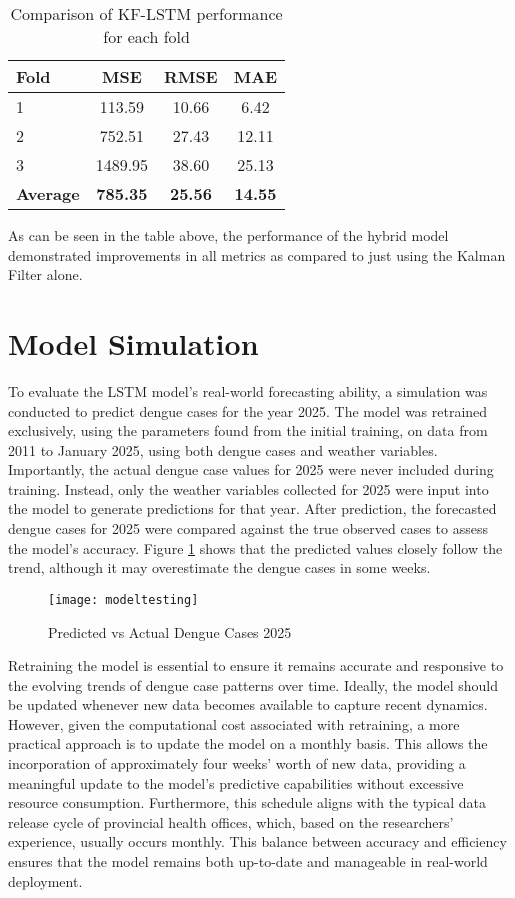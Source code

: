 \begin{table}[h!]
	\centering
	\begin{tabular}{|l|c|c|c|}
		\hline
		\textbf{Fold} & \textbf{MSE} & \textbf{RMSE} & \textbf{MAE} \\
		\hline
		1 & 113.59  & 10.66 & 6.42 \\
		2 & 752.51 & 27.43 & 12.11 \\
		3 & 1489.95  & 38.60 & 25.13 \\
		\hline
		\textbf{Average} & \textbf{785.35} & \textbf{25.56} & \textbf{14.55} \\
		\hline
	\end{tabular}
	\caption{Comparison of KF-LSTM performance for each fold}
	\label{tab:tcsv_kflstm}
\end{table}

As can be seen in the table above, the performance of the hybrid model demonstrated improvements in all metrics as compared to just using the Kalman Filter alone.

\section{Model Simulation}
To evaluate the LSTM model's real-world forecasting ability, a simulation was conducted to predict dengue cases for the year 2025. The model was retrained exclusively, using the parameters found from the initial training, on data from 2011 to January 2025, using both dengue cases and weather variables. Importantly, the actual dengue case values for 2025 were never included during training. Instead, only the weather variables collected for 2025 were input into the model to generate predictions for that year. After prediction, the forecasted dengue cases for 2025 were compared against the true observed cases to assess the model’s accuracy. Figure \ref{fig:modeltesting} shows that the predicted values closely follow the trend, although it may overestimate the dengue cases in some weeks. 

\begin{figure}[H]
	\centering
	\texttt{[image: modeltesting]}
	\caption{Predicted vs Actual Dengue Cases 2025}
	\label{fig:modeltesting}
\end{figure}

Retraining the model is essential to ensure it remains accurate and responsive to the evolving trends of dengue case patterns over time. Ideally, the model should be updated whenever new data becomes available to capture recent dynamics. However, given the computational cost associated with retraining, a more practical approach is to update the model on a monthly basis. This allows the incorporation of approximately four weeks’ worth of new data, providing a meaningful update to the model’s predictive capabilities without excessive resource consumption. Furthermore, this schedule aligns with the typical data release cycle of provincial health offices, which, based on the researchers’ experience, usually occurs monthly. This balance between accuracy and efficiency ensures that the model remains both up-to-date and manageable in real-world deployment.

